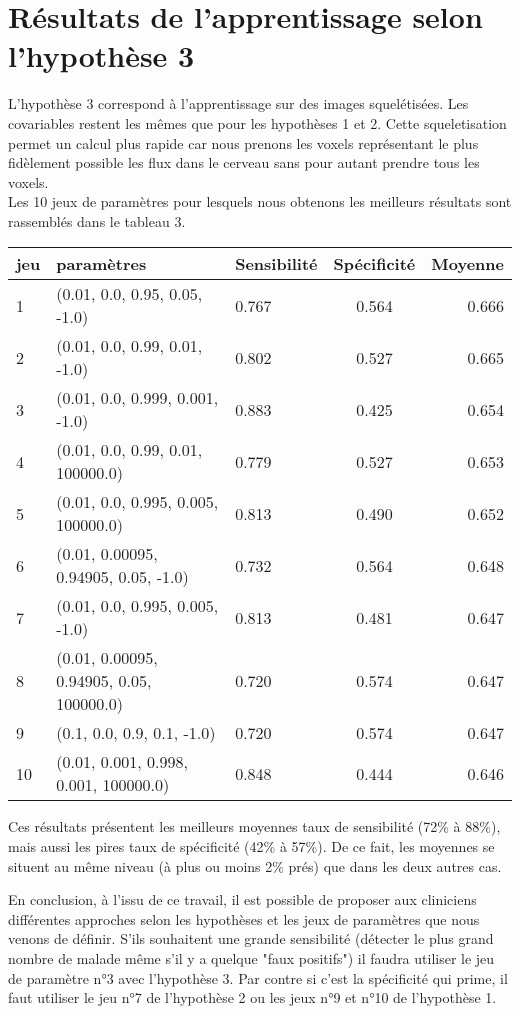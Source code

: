 \section{Résultats de l'apprentissage selon l'hypothèse 3}

L'hypothèse 3 correspond à l'apprentissage sur des images squelétisées. Les covariables restent les mêmes que pour les hypothèses 1 et 2. Cette squeletisation permet un calcul plus rapide car nous prenons les voxels représentant le plus fidèlement possible les flux dans le cerveau sans pour autant prendre tous les voxels. 
\\

Les 10  jeux de paramètres pour lesquels nous obtenons les meilleurs résultats sont rassemblés dans le tableau 3.

\begin{tabular}{|l|l|l|c|r|}
	\hline
	jeu & paramètres & Sensibilité & Spécificité & Moyenne \\
	\hline
	1 & (0.01, 0.0, 0.95, 0.05, -1.0) & 0.767 & 0.564 & 0.666 \\
	2 & (0.01, 0.0, 0.99, 0.01, -1.0) & 0.802 & 0.527 & 0.665 \\
	3 & (0.01, 0.0, 0.999, 0.001, -1.0) & 0.883 & 0.425 & 0.654 \\
	4 & (0.01, 0.0, 0.99, 0.01, 100000.0) & 0.779 & 0.527 & 0.653 \\
	5 & (0.01, 0.0, 0.995, 0.005, 100000.0) & 0.813 & 0.490 & 0.652 \\
	6 & (0.01, 0.00095, 0.94905, 0.05, -1.0) & 0.732 & 0.564 & 0.648 \\
	7 & (0.01, 0.0, 0.995, 0.005, -1.0) & 0.813 & 0.481 & 0.647 \\
	8 & (0.01, 0.00095, 0.94905, 0.05, 100000.0) & 0.720 & 0.574 & 0.647 \\
	9 & (0.1, 0.0, 0.9, 0.1, -1.0) & 0.720 & 0.574 & 0.647 \\
	10 & (0.01, 0.001, 0.998, 0.001, 100000.0) & 0.848 & 0.444 & 0.646 \\
	\hline
	
\end{tabular}

Ces résultats présentent les meilleurs moyennes taux de sensibilité (72\% à 88\%), mais aussi les pires taux de spécificité (42\% à 57\%). De ce fait, les moyennes se situent au même niveau (à plus ou moins 2\% prés) que dans les deux autres cas.

\bigskip

En conclusion, à l'issu de ce travail, il est possible de proposer aux cliniciens différentes approches selon les hypothèses et les jeux de paramètres que nous venons de définir. S'ils souhaitent une grande sensibilité (détecter le plus grand nombre de malade même s'il y a quelque "faux positifs") il faudra utiliser le jeu de paramètre n°3 avec l'hypothèse 3. Par contre si c'est la spécificité qui prime, il faut utiliser le jeu n°7 de l'hypothèse 2 ou les jeux n°9 et n°10 de l'hypothèse 1.